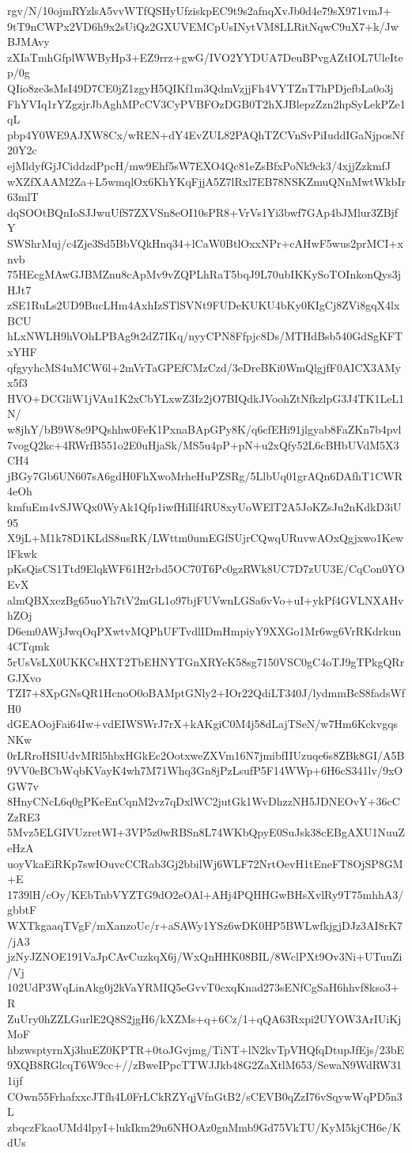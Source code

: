 rgv/N/10ojmRYzlsA5vvWTfQSHyUfziskpEC9t9s2afnqXvJb0d4e79sX971vmJ+
9tT9nCWPx2VD6h9x2sUiQz2GXUVEMCpUsINytVM8LLRitNqwC9uX7+k/JwBJMAvy
zXIaTmhGfplWWByHp3+EZ9rrz+gwG/IVO2YYDUA7DeuBPvgAZtIOL7UleItep/0g
QIio8ze3sMsI49D7CE0jZ1zgyH5QIKf1m3QdmVzjjFh4VYTZnT7hPDjefbLa0o3j
FhYVIq1rYZgzjrJbAghMPcCV3CyPVBFOzDGB0T2hXJBlepzZzn2hpSyLekPZe1qL
pbp4Y0WE9AJXW8Cx/wREN+dY4EvZUL82PAQhTZCVnSvPiIuddIGaNjposNf20Y2c
ejMldyfGjJCiddzdPpcH/mw9Ehf5sW7EXO4Qc81eZsBfxPoNk9ck3/4xjjZzkmfJ
wXZfXAAM2Za+L5wmqlOx6KhYKqFjjA5Z7lRxl7EB78NSKZmuQNnMwtWkbIr63mlT
dqSOOtBQnIoSJJwuUfS7ZXVSn8eOI10sPR8+VrVs1Yi3bwf7GAp4bJMlur3ZBjfY
SWShrMuj/c4Zje3Sd5BbVQkHnq34+lCaW0BtlOxxNPr+cAHwF5wus2prMCI+xnvb
75HEcgMAwGJBMZnu8cApMv9vZQPLhRaT5bqJ9L70ubIKKySoTOInkonQys3jHJt7
zSE1RuLs2UD9BucLHm4AxhIzSTlSVNt9FUDeKUKU4bKy0KIgCj8ZVi8gqX4lxBCU
hLxNWLH9hVOhLPBAg9t2dZ7IKq/nyyCPN8Ffpjc8Ds/MTHdBsb540GdSgKFTxYHF
qfgyyhcMS4uMCW6l+2mVrTaGPEfCMzCzd/3eDreBKi0WmQlgjfF0AICX3AMyx5f3
HVO+DCGliW1jVAu1K2xCbYLxwZ3Iz2jO7BIQdkJVoohZtNfkzlpG3J4TK1LeL1N/
w8jhY/bB9W8e9PQshhw0FeK1PxnaBApGPy8K/q6cfEHi91jlgyab8FaZKn7b4pvl
7vogQ2kc+4RWrfB551o2E0uHjaSk/MS5u4pP+pN+u2xQfy52L6cBHbUVdM5X3CH4
jBGy7Gb6UN607sA6gdH0FhXwoMrheHuPZSRg/5LlbUq01grAQn6DAfhT1CWR4eOh
kmfuEm4vSJWQx0WyAk1Qfp1iwfHiIlf4RU8xyUoWElT2A5JoKZsJu2nKdkD3iU95
X9jL+M1k78D1KLdS8usRK/LWttm0umEGfSUjrCQwqURuvwAOxQgjxwo1KewlFkwk
pKsQisCS1Ttd9ElqkWF61H2rbd5OC70T6Pc0gzRWk8UC7D7zUU3E/CqCon0YOEvX
almQBXxezBg65uoYh7tV2mGL1o97bjFUVwnLGSa6vVo+uI+ykPf4GVLNXAHvhZOj
D6em0AWjJwqOqPXwtvMQPhUFTvdlIDmHmpiyY9XXGo1Mr6wg6VrRKdrkun4CTqmk
5rUsVsLX0UKKCsHXT2TbEHNYTGnXRYeK58sg7150VSC0gC4oTJ9gTPkgQRrGJXvo
TZI7+8XpGNsQR1HcnoO0oBAMptGNly2+IOr22QdiLT340J/lydmmBcS8fadsWfH0
dGEAOojFai64Iw+vdEIWSWrJ7rX+kAKgiC0M4j58dLajTSeN/w7Hm6KckvgqsNKw
0rLRroHSIUdvMRl5hbxHGkEc2OotxweZXVm16N7jmibfIIUzuqe6s8ZBk8GI/A5B
9VV0eBCbWqbKVayK4wh7M71Whq3Gn8jPzLsufP5F14WWp+6H6cS341lv/9xOGW7v
8HnyCNcL6q0gPKeEnCqnM2vz7qDxlWC2jutGk1WvDhzzNH5JDNEOvY+36cCZzRE3
5Mvz5ELGIVUzretWI+3VP5z0wRBSn8L74WKbQpyE0SuJsk38cEBgAXU1NuuZeHzA
uoyVkaEiRKp7swIOuvcCCRab3Gj2bbilWj6WLF72NrtOevH1tEneFT8OjSP8GM+E
1739lH/cOy/KEbTnbVYZTG9dO2eOAl+AHj4PQHHGwBHsXvlRy9T75mhhA3/gbbtF
WXTkgaaqTVgF/mXanzoUc/r+aSAWy1YSz6wDK0HP5BWLwfkjgjDJz3AI8rK7/jA3
jzNyJZNOE191VaJpCAvCuzkqX6j/WxQnHHK08BIL/8WclPXt9Ov3Ni+UTuuZi/Vj
102UdP3WqLinAkg0j2kVaYRMIQ5eGvvT0cxqKnad273sENfCgSaH6hhvf8kso3+R
ZuUry0hZZLGurlE2Q8S2jgH6/kXZMs+q+6Cz/1+qQA63Rxpi2UYOW3ArIUiKjMoF
hbzwsptyrnXj3huEZ0KPTR+0toJGvjmg/TiNT+lN2kvTpVHQfqDtupJfEjs/23bE
9XQB8RGlcqT6W9cc+//zBweIPpcTTWJJkb48G2ZaXtlM653/SewaN9WdRW311ijf
COwn55FrhafxxcJTfh4L0FrLCkRZYqjVfnGtB2/sCEVB0qZzI76vSqywWqPD5n3L
zbqczFkaoUMd4lpyI+lukIkm29n6NHOAz0gnMmb9Gd75VkTU/KyM5kjCH6e/KdUs
